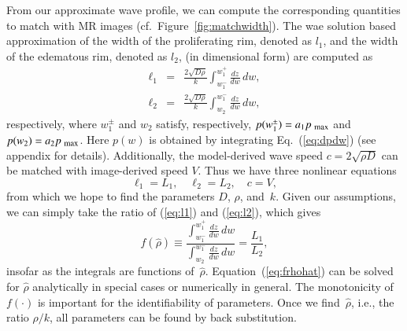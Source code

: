\documentclass{aims}
\numberwithin{equation}{section}
\begin{document}
From our approximate wave profile, we can compute the corresponding
quantities to match with MR images (cf.\ Figure~\ref{fig:matchwidth}). The wae solution based approximation of the width of the proliferating rim, denoted as $l_1$, and the width of the edematous rim, denoted as $l_2$, (in dimensional form) are computed as
\begin{subequations}
\begin{eqnarray}
\ell_{1} & = & \frac{2\sqrt{D\rho}}{k}
  \int_{w_{1}^{-}}^{w_{1}^+} \frac{dz}{dw} \,dw,\label{eq:l1}\\
\ell_{2} & = & \frac{2\sqrt{D\rho}}{k}
  \int_{w_{2}}^{w_{1}^-} \frac{dz}{dw}\, dw,\label{eq:l2}
\end{eqnarray}
\end{subequations}
respectively, where $w_{1}^{\pm}$ and $w_{2}$ satisfy, respectively,
$p(w_{1}^{\pm})=a_{1}p_{\mbox{\scriptsize max}}$ and
$p(w_{2})=a_{2}p_{\mbox{\scriptsize max}}$.  Here
$p(w)$ is obtained by integrating Eq.~(\ref{eq:dpdw}) (see appendix for details).
Additionally, the model-derived wave speed $c=2\sqrt{\rho D}$
can be matched with image-derived speed
$V$. Thus we have three nonlinear equations
\begin{equation}
\ell_{1}=L_{1},\quad \ell_{2}=L_{2},\quad c=V,
\label{eq:l1l2c}
\end{equation}
from which we hope to find the parameters $D$, $\rho$, and~$k$.  Given our
assumptions, we can simply take the ratio of
(\ref{eq:l1}) and (\ref{eq:l2}), which gives
\begin{equation}
f(\hat{\rho})\equiv
\frac{\displaystyle\int_{w_{1}^{-}}^{w_{1}^{+}}\frac{dz}{dw}\,dw}
  {\displaystyle\int_{w_{2}}^{w_{1}^{-}}\frac{dz}{dw}\,dw}=
  \frac{L_{1}}{L_{2}},
\label{eq:frhohat}
\end{equation}
insofar as the integrals are functions of~$\hat{\rho}$. 
Equation~(\ref{eq:frhohat})
can be solved for $\hat{\rho}$ analytically in special cases or numerically
in general.  The monotonicity of $f(\cdot)$ is important
for the identifiability of parameters. Once we find~$\hat{\rho}$, i.e., the ratio 
$\rho/k$, all parameters can be found by back substitution.
\end{document}
